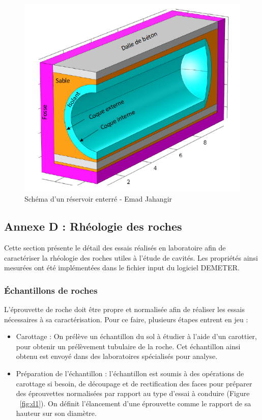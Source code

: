 \documentclass[11pt,french,a4paper]{article}
\begin{document}
\begin{figure}[h]
\centering
\includegraphics[width=.7\linewidth]{image/annexe/reservoir_ent/reservoir3D.png}
\caption{Schéma d'un réservoir enterré - Emad Jahangir}
\end{figure}

\FloatBarrier
\subsection*{Annexe D : Rhéologie des roches} 
Cette section présente le détail des essais réalisés en laboratoire afin de caractériser la rhéologie des roches utiles à l’étude de cavités. 
Les propriétés ainsi mesurées ont été implémentées dans le fichier input du logiciel DEMETER. 

\subsubsection*{Échantillons de roches}

L’éprouvette de roche doit être propre et normalisée afin de réaliser les essais nécessaires à sa caractérisation. 
Pour ce faire, plusieurs étapes entrent en jeu : 
\begin{itemize}
\item Carottage : On prélève un échantillon du sol à étudier à l’aide d’un carottier, pour obtenir un prélèvement tubulaire de la roche. Cet échantillon ainsi obtenu est envoyé dans des laboratoires spécialisés pour analyse. 
\item
Préparation de l’échantillon : l'échantillon est soumis à des opérations de carottage si besoin, de découpage et de rectification des faces pour préparer des éprouvettes normalisées par rapport au type d'essai à conduire (Figure ~\ref{fig:d1}). On définit l’élancement d’une éprouvette comme le rapport de sa hauteur sur son diamètre.
\end{itemize}
\end{document}
